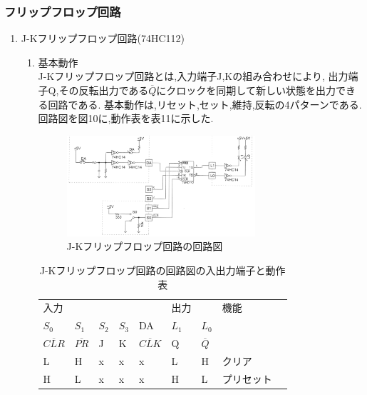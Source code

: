 \documentclass[twocolumn, 10pt,a4j]{jsarticle}
\begin{document}
  \subsubsection{フリップフロップ回路}
    \begin{enumerate}
      \item J-Kフリップフロップ回路(74HC112)
        \begin{enumerate}
          \item 基本動作 \\
            J-Kフリップフロップ回路とは,入力端子J,Kの組み合わせにより,
            出力端子Q,その反転出力である$\overline{Q}$にクロックを同期して新しい状態を出力できる回路である.
            基本動作は,リセット,セット,維持,反転の4パターンである.回路図を図10に,動作表を表11に示した.
            \begin{figure}[H]
              \begin{center}
                \includegraphics[width=7cm]{../img/junjokairo/jk_flip_flop.png}
                \caption{J-Kフリップフロップ回路の回路図}
              \end{center}
            \end{figure}
            \begin{table}[H]
              \centering
              \caption{J-Kフリップフロップ回路の回路図の入出力端子と動作表}
              \label{my-label}
                \footnotesize
                \begin{tabular}{lllll|ll|ll}
                入力      &         &         &         &     & 出力      &         & 機能        \\ \cline{1-7}
                $S_{0}$ & $S_{1}$ & $S_{2}$ & $S_{3}$ & DA  & $L_{1}$ & $L_{0}$ &               \\ \cline{1-7}
                $\overline{CLR}$  & $\overline{PR}$   & J   & K       & $\overline{CLK}$ & Q & $\overline{Q}$ &  \\ \hline
                L       & H       & x       & x       & x   & L       & H       & クリア  \\
                H       & L       & x       & x       & x   & H       & L       & プリセット  \\

\end{tabular}
\end{table}
\end{enumerate}
\end{enumerate}
\end{document}
